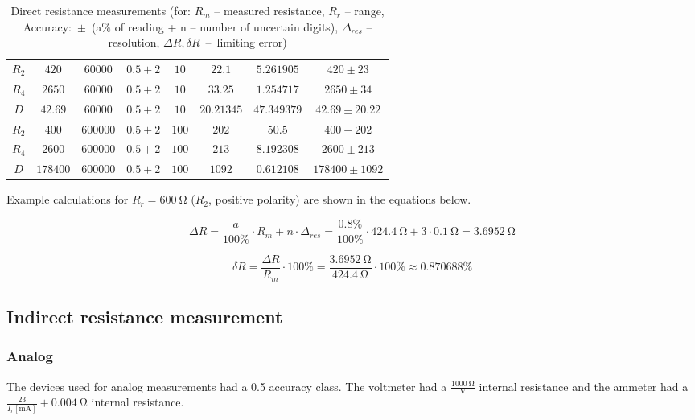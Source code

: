 \begin{table}[H]
\begin{tabular}{|  c | c | c | c | c | c | c | c |}
		\hline
		$R_2$ & $420$ & $60000$ & $0.5+2$ & $10$ & $22.1$ & $5.261905$ & $420 \pm 23$ \\
		$R_4$ & $2650$ & $60000$ & $0.5+2$ & $10$ & $33.25$ & $1.254717$ & $2650 \pm 34$ \\
		$D$ & $42.69$ & $60000$ & $0.5+2$ & $10$ & $20.21345$ & $47.349379$ & $42.69 \pm 20.22$ \\
		\hline
		$R_2$ & $400$ & $600000$ & $0.5+2$ & $100$ & $202$ & $50.5$ & $400 \pm 202$ \\
		$R_4$ & $2600$ & $600000$ & $0.5+2$ & $100$ & $213$ & $8.192308$ & $2600 \pm 213$ \\
		$D$ & $178400$ & $600000$ & $0.5+2$ & $100$ & $1092$ & $0.612108$ & $178400 \pm 1092$ \\
		\hline
	\end{tabular}
	\caption{Direct resistance measurements (for: $R_m$ -- measured resistance, $R_r$ -- range, Accuracy:~$\pm$~(a$\unit{\percent}$ of reading + n  -- number of uncertain digits), $\Delta_{res}$ -- resolution, $\Delta R, \delta R$~--~limiting error)}
	\label{tab:direct}
\end{table}

Example calculations for $R_r = \SI{600}{\ohm}$ ($R_2$, positive polarity) are shown in the equations below.

\begin{equation}
	\Delta R = \frac{a}{100\unit{\percent}}\cdot R_m + n\cdot \Delta_{res} = \frac{0.8\unit{\percent}}{100\unit{\percent}}\cdot\SI{424.4}{\ohm} + 3\cdot\SI{0.1}{\ohm} = \SI{3.6952}{\ohm}
\end{equation}

\begin{equation}
	\delta R = \frac{\Delta R}{R_m}\cdot 100\unit{\percent} = \frac{\SI{3.6952}{\ohm}}{\SI{424.4}{\ohm}}\cdot 100\unit{\percent}\approx 0.870688\unit{\percent}
\end{equation}

\subsection{Indirect resistance measurement}

\subsubsection{Analog}

The devices used for analog measurements had a 0.5 accuracy class. The voltmeter had a $\frac{\SI{1000}{\ohm}}{\unit{\volt}}$ internal resistance and the ammeter had a $\frac{23}{I_r[\unit{\milli\ampere}]} + \SI{0.004}{\ohm}$ internal resistance.

